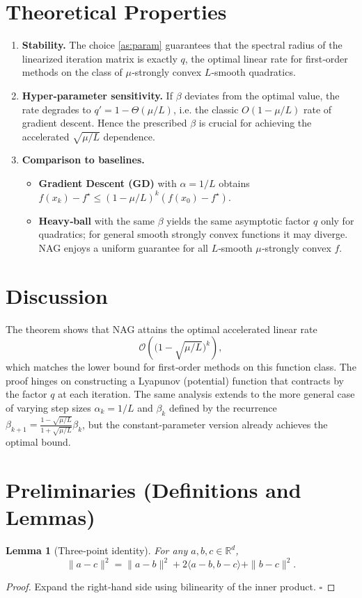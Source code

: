 \documentclass{article}
\newtheorem{lemma}{Lemma}[section]
\begin{document}
\section*{Theoretical Properties}
\begin{enumerate}[label=\arabic*.]
\item \textbf{Stability.} The choice \eqref{as:param} guarantees that the spectral radius of the linearized iteration matrix is exactly $q$, the optimal linear rate for first‑order methods on the class of $\mu$‑strongly convex $L$‑smooth quadratics.
\item \textbf{Hyper‑parameter sensitivity.} If $\beta$ deviates from the optimal value, the rate degrades to $q' = 1-\Theta(\mu/L)$, i.e. the classic $O(1-\mu/L)$ rate of gradient descent. Hence the prescribed $\beta$ is crucial for achieving the accelerated $\sqrt{\mu/L}$ dependence.
\item \textbf{Comparison to baselines.}
    \begin{itemize}
        \item \textbf{Gradient Descent (GD)} with $\alpha=1/L$ obtains $f(x_k)-f^\star\le (1-\mu/L)^k (f(x_0)-f^\star)$.
        \item \textbf{Heavy‑ball} with the same $\beta$ yields the same asymptotic factor $q$ only for quadratics; for general smooth strongly convex functions it may diverge. NAG enjoys a uniform guarantee for all $L$‑smooth $\mu$‑strongly convex $f$.
    \end{itemize}
\end{enumerate}

\section*{Discussion}
The theorem shows that NAG attains the optimal accelerated linear rate
\[
\mathcal{O}\!\left(\bigl(1-\sqrt{\mu/L}\bigr)^{k}\right),
\]
which matches the lower bound for first‑order methods on this function class. The proof hinges on constructing a Lyapunov (potential) function that contracts by the factor $q$ at each iteration. The same analysis extends to the more general case of varying step sizes $\alpha_k=1/L$ and $\beta_k$ defined by the recurrence $\beta_{k+1}= \frac{1-\sqrt{\mu/L}}{1+\sqrt{\mu/L}}\beta_k$, but the constant‑parameter version already achieves the optimal bound.

\section*{Preliminaries (Definitions and Lemmas)}
\begin{lemma}[Three‑point identity]\label{lem:three}
For any $a,b,c\in\mathbb{R}^d$,
\[
\|a-c\|^2 = \|a-b\|^2 + 2\langle a-b, b-c\rangle + \|b-c\|^2.
\tag{L1}
\]
\end{lemma}
\begin{proof}
Expand the right‑hand side using bilinearity of the inner product. \hfill $\square$
\end{proof}
\end{document}
